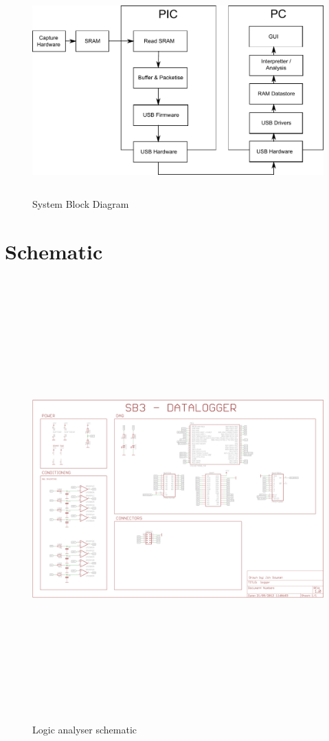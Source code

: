 \documentclass[11pt]{article}
\begin{document}
    \begin{figure}
    \centering
    \includegraphics[height=8cm]{block-diagram.pdf}
    \caption{System Block Diagram}
    \label{fig:app}
    \end{figure}
	
\appendix
\appendixpage
\addappheadtotoc
\section{Schematic}
\label{app-schematic}
			
    \begin{figure}
    \centering
    \includegraphics[height=17cm,angle=90]{../../hardware/schematic.png}
    \caption{Logic analyser schematic}
    \label{fig:sch}
    \end{figure}
\end{document}
